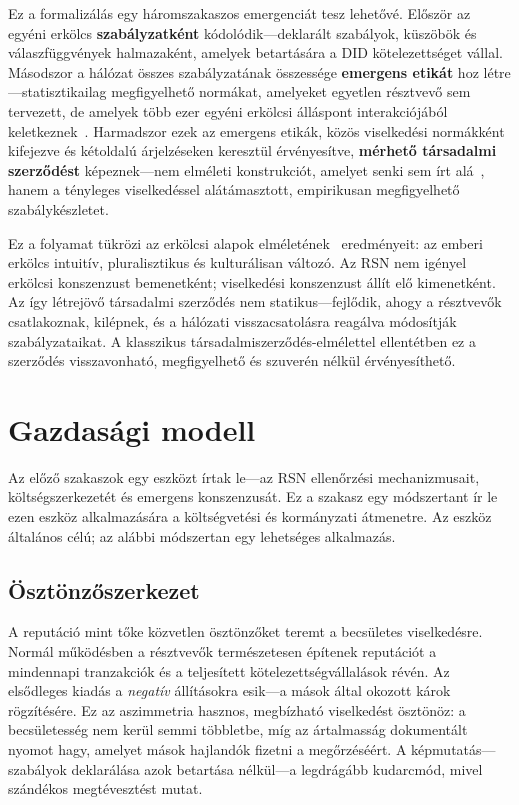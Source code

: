 \documentclass[11pt,a4paper,twocolumn]{article}
\begin{document}
Ez a formalizálás egy háromszakaszos emergenciát tesz lehetővé. Először az egyéni erkölcs \textbf{szabályzatként} kódolódik---deklarált szabályok, küszöbök és válaszfüggvények halmazaként, amelyek betartására a DID kötelezettséget vállal. Másodszor a hálózat összes szabályzatának összessége \textbf{emergens etikát} hoz létre---statisztikailag megfigyelhető normákat, amelyeket egyetlen résztvevő sem tervezett, de amelyek több ezer egyéni erkölcsi álláspont interakciójából keletkeznek~\cite{durkheim1893}. Harmadszor ezek az emergens etikák, közös viselkedési normákként kifejezve és kétoldalú árjelzéseken keresztül érvényesítve, \textbf{mérhető társadalmi szerződést} képeznek---nem elméleti konstrukciót, amelyet senki sem írt alá~\cite{rawls1971}, hanem a tényleges viselkedéssel alátámasztott, empirikusan megfigyelhető szabálykészletet.

Ez a folyamat tükrözi az erkölcsi alapok elméletének~\cite{haidt2012} eredményeit: az emberi erkölcs intuitív, pluralisztikus és kulturálisan változó. Az RSN nem igényel erkölcsi konszenzust bemenetként; viselkedési konszenzust állít elő kimenetként. Az így létrejövő társadalmi szerződés nem statikus---fejlődik, ahogy a résztvevők csatlakoznak, kilépnek, és a hálózati visszacsatolásra reagálva módosítják szabályzataikat. A klasszikus társadalmiszerződés-elmélettel ellentétben ez a szerződés visszavonható, megfigyelhető és szuverén nélkül érvényesíthető.

\section{Gazdasági modell}

Az előző szakaszok egy eszközt írtak le---az RSN ellenőrzési mechanizmusait, költségszerkezetét és emergens konszenzusát. Ez a szakasz egy módszertant ír le ezen eszköz alkalmazására a költségvetési és kormányzati átmenetre. Az eszköz általános célú; az alábbi módszertan egy lehetséges alkalmazás.

\subsection{Ösztönzőszerkezet}

A reputáció mint tőke közvetlen ösztönzőket teremt a becsületes viselkedésre. Normál működésben a résztvevők természetesen építenek reputációt a mindennapi tranzakciók és a teljesített kötelezettségvállalások révén. Az elsődleges kiadás a \emph{negatív} állításokra esik---a mások által okozott károk rögzítésére. Ez az aszimmetria hasznos, megbízható viselkedést ösztönöz: a becsületesség nem kerül semmi többletbe, míg az ártalmasság dokumentált nyomot hagy, amelyet mások hajlandók fizetni a megőrzéséért. A képmutatás---szabályok deklarálása azok betartása nélkül---a legdrágább kudarcmód, mivel szándékos megtévesztést mutat.
\end{document}
